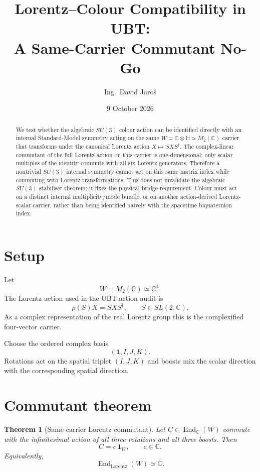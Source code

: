 \documentclass[11pt,a4paper]{article}
\title{Lorentz--Colour Compatibility in UBT:\\
A Same-Carrier Commutant No-Go}
\author{Ing.\ David Jaro\v{s}}
\date{9 October 2026}
\newtheorem{theorem}{Theorem}
\begin{document}
\maketitle

\begin{abstract}
We test whether the algebraic $SU(3)$ colour action can be identified directly
with an internal Standard-Model symmetry acting on the same
$W=\mathbb C\otimes\mathbb H\simeq M_2(\mathbb C)$ carrier that transforms
under the canonical Lorentz action $X\mapsto SXS^\dagger$.
The complex-linear commutant of the full Lorentz action on this carrier is
one-dimensional: only scalar multiples of the identity commute with all six
Lorentz generators.  Therefore a nontrivial $SU(3)$ internal symmetry cannot
act on this same matrix index while commuting with Lorentz transformations.
This does not invalidate the algebraic $SU(3)$ stabiliser theorem; it fixes the
physical bridge requirement.  Colour must act on a distinct internal
multiplicity/mode bundle, or on another action-derived Lorentz-scalar carrier,
rather than being identified naively with the spacetime biquaternion index.
\end{abstract}

\section{Setup}

Let
\[
 W=M_2(\mathbb C)\simeq\mathbb C^4.
\]
The Lorentz action used in the UBT action audit is
\[
 \rho(S)X=SXS^\dagger,\qquad S\in SL(2,\mathbb C).
\]
As a complex representation of the real Lorentz group this is the complexified
four-vector carrier.

Choose the ordered complex basis
\[
 (\mathbf1,I,J,K).
\]
Rotations act on the spatial triplet $(I,J,K)$ and boosts mix the scalar
direction with the corresponding spatial direction.

\section{Commutant theorem}

\begin{theorem}[Same-carrier Lorentz commutant]
Let $C\in\operatorname{End}_{\mathbb C}(W)$ commute with the infinitesimal
action of all three rotations and all three boosts.  Then
\[
 \boxed{C=c\,\mathbf1_W,\qquad c\in\mathbb C.}
\]
Equivalently,
\[
 \operatorname{End}_{\mathrm{Lorentz}}(W)\simeq\mathbb C.
\]
\end{theorem}
\end{document}

